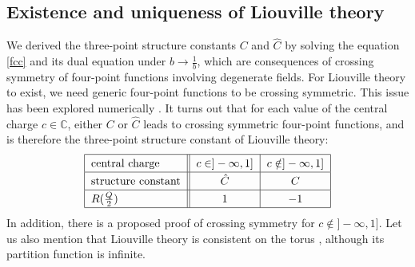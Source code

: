 \documentclass[12pt, a4paper, notitlepage, twoside]{report}
\numberwithin{equation}{section}
\theoremstyle{break}
\begin{document}
\subsection{Existence and uniqueness of Liouville theory}\label{seceul}

We derived the three-point structure constants $C$ and $\hat C$ by solving the equation \eqref{fcc} and its dual equation under $b\to \frac{1}{b}$, which are consequences of crossing symmetry of four-point functions involving degenerate fields. 
For Liouville theory to exist, we need generic four-point functions to be crossing symmetric. 
This issue has been explored numerically \cite{rs15}. 
It turns out that for each value of the central charge $c\in\mathbb{C}$, either $C$ or $\hat C$ leads to crossing symmetric four-point functions, and is therefore the three-point structure constant of Liouville theory:
\begin{align}
\renewcommand{\arraystretch}{1.3}
 \begin{tabular}{|l||c|c|}
  \hline
  central charge &  $c\in ]-\infty, 1]$ & $c\notin ]-\infty, 1]$
  \\
  \hline
  structure constant & $\hat C$  & $C$ 
  \\
  \hline 
  $R(\tfrac{Q}{2})$ & $1$ & $-1$
  \\
  \hline
 \end{tabular}
 \label{ccr}
\end{align}
In addition, there is a proposed proof \cite{tes03b} of crossing symmetry for $c\notin ]-\infty, 1]$.
Let us also mention that Liouville theory is consistent on the torus \cite{hjs09, rs15}, although its partition function is infinite. 
\end{document}

